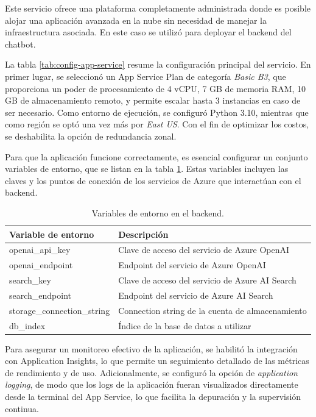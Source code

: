 Este servicio ofrece una plataforma completamente administrada donde es posible alojar una aplicación avanzada en la nube 
sin necesidad de manejar la infraestructura asociada. En este caso se utilizó para deployar el backend del chatbot.

La tabla \ref{tab:config-app-service} resume la configuración principal del servicio. En primer lugar, se seleccionó un App Service Plan de categoría \textit{Basic B3}, que proporciona un poder de procesamiento de 
4 vCPU, 7 GB de memoria RAM, 10 GB de almacenamiento remoto, y permite escalar hasta 3 instancias en caso de ser necesario. 
Como entorno de ejecución, se configuró Python 3.10, mientras que como región se optó una vez más por \textit{East US}. Con el 
fin de optimizar los costos, se deshabilita la opción de redundancia zonal.

Para que la aplicación funcione correctamente, es esencial configurar un conjunto variables de entorno, que se listan en la tabla \ref{tab:config-env}. Estas 
variables incluyen las claves y los puntos de conexión de los servicios de Azure que interactúan con el backend. 

\begin{table}[h]
	\centering
	\caption[Variables de entorno en el backend]{Variables de entorno en el backend.}
	\begin{tabular}{l l}    
		\toprule
		\textbf{Variable de entorno}  & \textbf{Descripción} 	                          \\
		\midrule
		openai\_api\_key              &	Clave de acceso del servicio de Azure OpenAI 	  \\		
		openai\_endpoint              & Endpoint del servicio de Azure OpenAI			  \\
		search\_key                   & Clave de acceso del servicio de Azure AI Search   \\
		search\_endpoint	          & Endpoint del servicio de Azure AI Search		  \\
        storage\_connection\_string   & Connection string de la cuenta de almacenamiento  \\
		db\_index	                  & Índice de la base de datos a utilizar		      \\
		\bottomrule
		\hline
	\end{tabular}
	\label{tab:config-env}
\end{table}

Para asegurar un monitoreo efectivo de la aplicación, se habilitó la integración con Application Insights, lo que permite un 
seguimiento detallado de las métricas de rendimiento y de uso. Adicionalmente, se configuró la opción de \textit{application logging}, 
de modo que los logs de la aplicación fueran visualizados directamente desde la terminal del App Service, lo que facilita la depuración 
y la supervisión continua.


